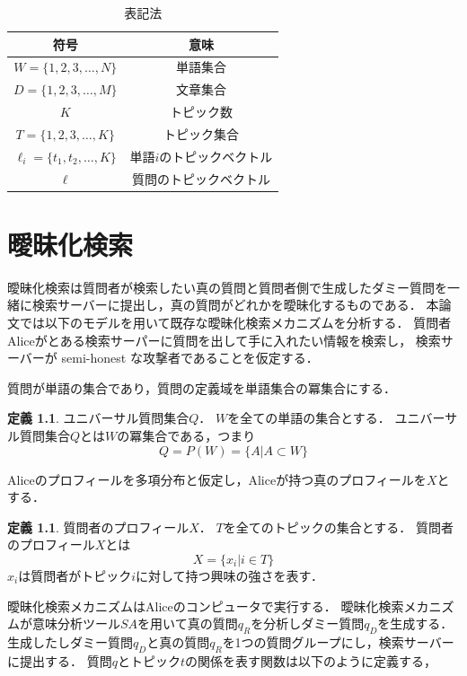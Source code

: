 \documentclass[master]{suribt}
\theoremstyle{definition}
\newtheorem{defi}[thm]{定義}
\begin{document}
 \begin{table}[!hbp]
 \center
 \begin{tabular}{|c|c|}
 \hline
 符号 & 意味 \\
 \hline
 $W = \{1,2,3, \dots ,N\} $ & 単語集合 \\
 $D = \{1,2,3, \dots ,M\}$ & 文章集合 \\
 $K$ & トピック数 \\
 $T = \{1,2,3, \dots ,K\}$ & トピック集合 \\
 $\ell_i = \{t_1,t_2,\dots,K\} $ & 単語$i$のトピックベクトル \\
 $\ell$ & 質問のトピックベクトル \\
 \hline
 \end{tabular}
 \caption{表記法}
 \end{table}

 \chapter{曖昧化検索} \label{s:OBS}
 曖昧化検索は質問者が検索したい真の質問と質問者側で生成したダミー質問を一緒に検索サーバーに提出し，真の質問がどれかを曖昧化するものである．
 本論文では以下のモデル\cite{}を用いて既存な曖昧化検索メカニズムを分析する．
 質問者Aliceがとある検索サーパーに質問を出して手に入れたい情報を検索し，
 検索サーバーが semi-honest な攻撃者であることを仮定する．
 
 質問が単語の集合であり，質問の定義域を単語集合の冪集合にする．
 
 \begin{defi}{ユニバーサル質問集合$Q$．}
  $W$を全ての単語の集合とする．
  ユニバーサル質問集合$Q$とは$W$の冪集合である，つまり
  \begin{equation}
  Q = P(W) = \{A|A \subset W\}
  \end{equation}
 \end{defi}
 Aliceのプロフィールを多項分布と仮定し，Aliceが持つ真のプロフィールを$X$とする．
 
 \begin{defi}{質問者のプロフィール$X$．}
  $T$を全てのトピックの集合とする．
  質問者のプロフィール$X$とは
  \begin{equation}
   X = \{x_i| i \in T\}
  \end{equation}
  $x_i$は質問者がトピック$i$に対して持つ興味の強さを表す．
 \end{defi}
 曖昧化検索メカニズムはAliceのコンピュータで実行する．
 曖昧化検索メカニズムが意味分析ツール$SA$を用いて真の質問$q_R$を分析しダミー質問$q_D$を生成する．
 生成したしダミー質問$q_D$と真の質問$q_R$を1つの質問グループにし，検索サーバーに提出する．
 質問$q$とトピック$t$の関係を表す関数は以下のように定義する，
 
\end{document}
